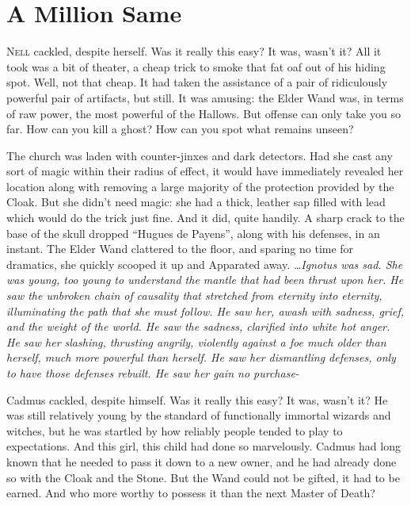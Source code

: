 \chapter{A Million Same}
\lettrine{N}{ell} cackled, despite herself. Was it really this easy? It was, wasn’t it? All it took was a bit of theater, a cheap trick to smoke that fat oaf out of his hiding spot. Well, not that cheap. It had taken the assistance of a pair of ridiculously powerful pair of artifacts, but still. It was amusing: the Elder Wand was, in terms of raw power, the most powerful of the Hallows. But offense can only take you so far. How can you kill a ghost? How can you spot what remains unseen?

The church was laden with counter-jinxes and dark detectors. Had she cast any sort of magic within their radius of effect, it would have immediately revealed her location along with removing a large majority of the protection provided by the Cloak. But she didn’t need magic: she had a thick, leather sap filled with lead which would do the trick just fine. And it did, quite handily. A sharp crack to the base of the skull dropped “Hugues de Payens”, along with his defenses, in an instant. The Elder Wand clattered to the floor, and sparing no time for dramatics, she quickly scooped it up and Apparated away.
\simpleline
\emph{…Ignotus was sad. She was young, too young to understand the mantle that had been thrust upon her. He saw the unbroken chain of causality that stretched from eternity into eternity, illuminating the path that she must follow. He saw her, awash with sadness, grief, and the weight of the world. He saw the sadness, clarified into white hot anger. He saw her slashing, thrusting angrily, violently against a foe much older than herself, much more powerful than herself. He saw her dismantling defenses, only to have those defenses rebuilt. He saw her gain no purchase-}
\simpleline
{}

Cadmus cackled, despite himself. Was it really this easy? It was, wasn’t it? He was still relatively young by the standard of functionally immortal wizards and witches, but he was startled by how reliably people tended to play to expectations. And this girl, this child had done so marvelously. Cadmus had long known that he needed to pass it down to a new owner, and he had already done so with the Cloak and the Stone. But the Wand could not be gifted, it had to be earned. And who more worthy to possess it than the next Master of Death?

